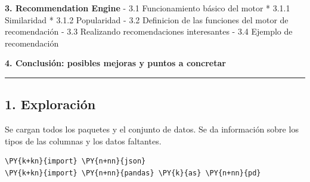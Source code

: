 \textbf{3. Recommendation Engine} - 3.1 Funcionamiento básico del motor
* 3.1.1 Similaridad * 3.1.2 Popularidad - 3.2 Definicion de las
funciones del motor de recomendación - 3.3 Realizando recomendaciones
interesantes - 3.4 Ejemplo de recomendación

\textbf{4. Conclusión: posibles mejoras y puntos a concretar}

    \begin{center}\rule{0.5\linewidth}{\linethickness}\end{center}

\subsection{1. Exploración}\label{exploraciuxf3n}

Se cargan todos los paquetes y el conjunto de datos. Se da información
sobre los tipos de las columnas y los datos faltantes.

    \begin{tcolorbox}[breakable, size=fbox, boxrule=1pt, pad at break*=1mm,colback=cellbackground, colframe=cellborder]
\begin{Verbatim}[commandchars=\\\{\}]
\PY{k+kn}{import} \PY{n+nn}{json}
\PY{k+kn}{import} \PY{n+nn}{pandas} \PY{k}{as} \PY{n+nn}{pd}
\end{Verbatim}
\end{tcolorbox}

